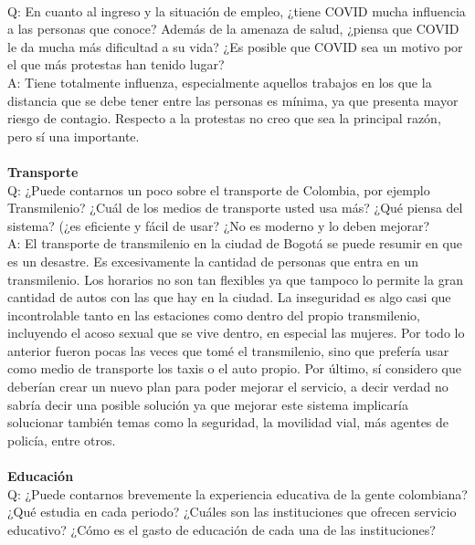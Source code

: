 \documentclass{phyasgn}\usepackage{nag}
\begin{document}
\\
Q: En cuanto al ingreso y la situación de empleo, ¿tiene COVID mucha influencia a las personas que conoce? Además de la amenaza de salud, ¿piensa que COVID le da mucha más dificultad a su vida? ¿Es posible que COVID sea un motivo por el que más protestas han tenido lugar?\\
A: Tiene totalmente influenza, especialmente aquellos trabajos en los que la distancia que se debe tener entre las personas es mínima, ya que presenta mayor riesgo de contagio. Respecto a la protestas no creo que sea la principal razón, pero sí una importante.\\
\\
\textbf{Transporte}\\
Q: ¿Puede contarnos un poco sobre el transporte de Colombia, por ejemplo Transmilenio? ¿Cuál de los medios de transporte usted usa más? ¿Qué piensa del sistema? (¿es eficiente y fácil de usar? ¿No es moderno y lo deben mejorar?\\
A: El transporte de transmilenio en la ciudad de Bogotá se puede resumir en que es un desastre. Es excesivamente la cantidad de personas que entra en un transmilenio. Los horarios no son tan flexibles ya que tampoco lo permite la gran cantidad de autos con las que hay en la ciudad. La inseguridad es algo casi que incontrolable tanto en las estaciones como dentro del propio transmilenio, incluyendo el acoso sexual que se vive dentro, en especial las mujeres. Por todo lo anterior fueron pocas las veces que tomé el transmilenio, sino que prefería usar como medio de transporte los taxis o el auto propio. Por último, sí considero que deberían crear un nuevo plan para poder mejorar el servicio, a decir verdad no sabría decir una posible solución ya que mejorar este sistema implicaría solucionar también temas como la seguridad, la movilidad vial, más agentes de policía, entre otros.\\
\\
\textbf{Educación}\\
Q: ¿Puede contarnos brevemente la experiencia educativa de la gente colombiana? ¿Qué estudia en cada periodo? ¿Cuáles son las instituciones que ofrecen servicio educativo? ¿Cómo es el gasto de educación de cada una de las instituciones? \\
\end{document}
